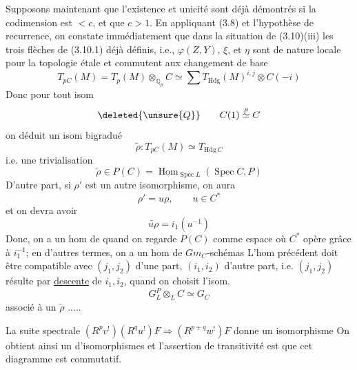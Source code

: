 Supposons maintenant que l'existence et unicité sont déjà démontrés si la codimension est $<c$, et que $c>1$. En appliquant (3.8) et l'hypothèse de recurrence, on constate immédiatement que dans la situation de (3.10)(iii) les trois flèches de  (3.10.1) déjà définis, i.e., $\varphi(Z,Y)$, $\xi$, et $\eta$ sont de nature locale pour la topologie étale et commutent aux changement de base
\[
T_{pC}(M)=T_p(M)\otimes_{\mathbb Q_p}C\simeq\sum T_{\mathrm{Hdg}}(M)^{i,j}\otimes C(-i)
\]
Donc pour tout isom
\[
\deleted{\unsure{Q}}\qquad C(1)\overset{\rho}{\simeq}C
\]
on déduit un isom bigradué
\[
\widetilde\rho:T_{pC}(M)\simeq T_{\mathrm{Hdg}\,C}
\]
i.e. une trivialisation
\[
\widetilde\rho\in P(C)=\operatorname{Hom}_{\operatorname{Spec}L}(\operatorname{Spec}C,P)
\]
D'autre part, si $\rho'$ est un autre isomorphisme, on aura
\[
\rho'=u\rho,\qquad u\in C^*
\]
et on devra avoir
\[
\widetilde{u\rho}=i_1(u^{-1})
\]
Donc, on a  un hom de  
quand on regarde $P(C)$ comme espace où $C^*$ opère grâce à $i_1^{-1}$; en d'autres termes, on a un hom de $Gm_C$-schémas
L'hom précédent doit être compatible avec $(j_1,j_2)$ d'une part, $(i_1,i_2)$ d'autre part, i.e. $(j_1,j_2)$ résulte par \uline{descente} de $i_1,i_2$, quand on choisit l'isom.
\[
G_L^P\otimes_L C\simeq G_C
\]
associé à un $\widetilde\rho$ .....

La suite spectrale $(R^pv^!)(R^qu^!)F\Longrightarrow(R^{p+q}w^!)F$ donne un isomorphisme
On obtient ainsi un  d'isomorphismes
et l'assertion de transitivité est que cet diagramme est commutatif.

